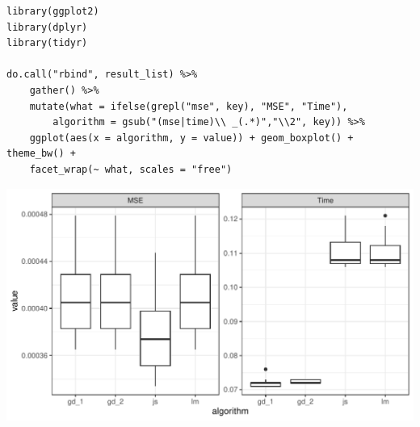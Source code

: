 \documentclass[a4paper]{article}
\begin{document}
{\begin{enumerate}
\begin{lstlisting}
library(ggplot2) 
library(dplyr) 
library(tidyr)

do.call("rbind", result_list) %>% 
    gather() %>%
    mutate(what = ifelse(grepl("mse", key), "MSE", "Time"),
        algorithm = gsub("(mse|time)\\ _(.*)","\\2", key)) %>%
    ggplot(aes(x = algorithm, y = value)) + geom_boxplot() + theme_bw() + 
    facet_wrap(~ what, scales = "free")
\end{lstlisting}

\includegraphics[width=\maxwidth]{figure/unnamed-chunk-3-1}

\end{enumerate}

}
\end{document}
